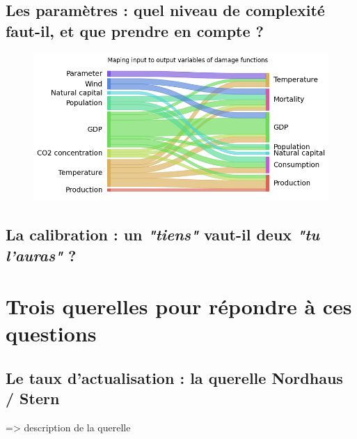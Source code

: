\begin{figure}
    \centering
    \label{fig:ACP}
\end{figure}

\subsection{Les paramètres : quel niveau de complexité faut-il, et que prendre en compte ?}

\begin{figure}
    \centering
    \includegraphics[width=0.9\linewidth]{figures/sankey.png}
\end{figure}

\subsection{La calibration : un \textit{"tiens"} vaut-il deux \textit{"tu l'auras"} ?}

\section{Trois querelles pour répondre à ces questions}

\subsection{Le taux d'actualisation : la querelle Nordhaus / Stern}

\cite{guigourez_10_2023} => description de la querelle

